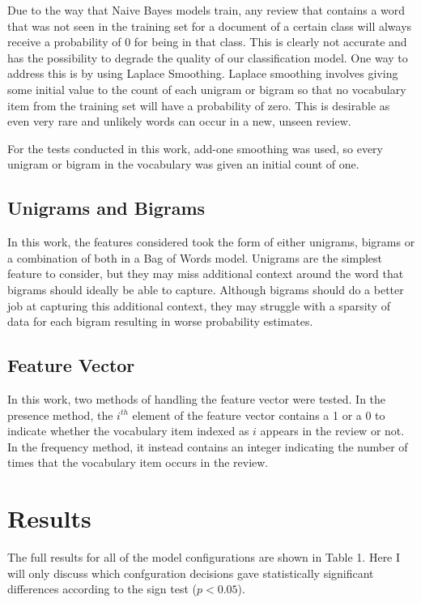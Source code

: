 \documentclass[twocolumn]{article}
\begin{document}
Due to the way that Naive Bayes models train, any review that contains a word that was not seen in the training set for a document of a certain class will always receive a probability of 0 for being in that class. This is clearly not accurate and has the possibility to degrade the quality of our classification model. One way to address this is by using Laplace Smoothing. Laplace smoothing involves giving some initial value to the count of each unigram or bigram so that no vocabulary item from the training set will have a probability of zero. This is desirable as even very rare and unlikely words can occur in a new, unseen review.

For the tests conducted in this work, add-one smoothing was used, so every unigram or bigram in the vocabulary was given an initial count of one.

\subsection{Unigrams and Bigrams}

In this work, the features considered took the form of either unigrams, bigrams or a combination of both in a Bag of Words model. Unigrams are the simplest feature to consider, but they may miss additional context around the word that bigrams should ideally be able to capture. Although bigrams should do a better job at capturing this additional context, they may struggle with a sparsity of data for each bigram resulting in worse probability estimates.

\subsection{Feature Vector}

In this work, two methods of handling the feature vector were tested. In the presence method, the $i^{th}$ element of the feature vector contains a 1 or a 0 to indicate whether the vocabulary item indexed as $i$ appears in the review or not. In the frequency method, it instead contains an integer indicating the number of times that the vocabulary item occurs in the review.

\section{Results}

The full results for all of the model configurations are shown in Table 1. Here I will only discuss which confguration decisions gave statistically significant differences according to the sign test ($p < 0.05$).
\end{document}
